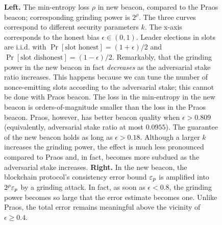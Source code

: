 \begin{figure}[!htb]
    \caption[New beacon security]{        
        \textbf{Left.} The min-entropy loss $\rho$ in new beacon, 
        compared to the Praos beacon; 
        corresponding grinding power is $2^\rho$.
        The three curves correspond to different security parameters $k$. 
        The x-axis corresponds to the honest bias $\epsilon \in (0,1)$.  
        Leader elections in slots are i.i.d. 
        with $\Pr[\text{slot honest}]=(1+\epsilon)/2$ and 
        $\Pr[\text{slot dishonest}]=(1-\epsilon)/2$. 
        Remarkably, that the grinding power in the new beacon in fact 
        \emph{decreases} as the adversarial stake ratio increases. 
        This happens because we can tune the number of nonce-emitting slots 
        according to the adversarial stake; 
        this cannot be done with Praos beacon.
        The loss in the min-entropy in the new beacon is orders-of-magnitude 
        smaller than the loss in the Praos beacon. 
        Praos, however, has better beacon quality when $\epsilon > 0.809$ 
        (equivalently, adversarial stake ratio at most $0.0955$). 
        The guarantee of the new beacon holds as long as $\epsilon > 0.18$. 
        Although a larger $k$ increases the grinding power, 
        the effect is much less pronounced compared to Praos 
        and, in fact, becomes more subdued as the adversarial stake increases. 
        \textbf{Right.} In the new beacon, the blockchain protocol's 
        consistency error bound $\mathsf{\varepsilon}_p$ 
        is amplified into $2^\rho \mathsf{\varepsilon}_p$ by a grinding attack. 
        In fact, as soon as $\epsilon < 0.8$, the grinding power becomes so large that 
        the error estimate becomes one. 
        Unlike Praos, the total error remains meaningful above the vicinity of $\epsilon \geq 0.4$.
    }
    \label{fig:poisson-beacon}
\end{figure}


